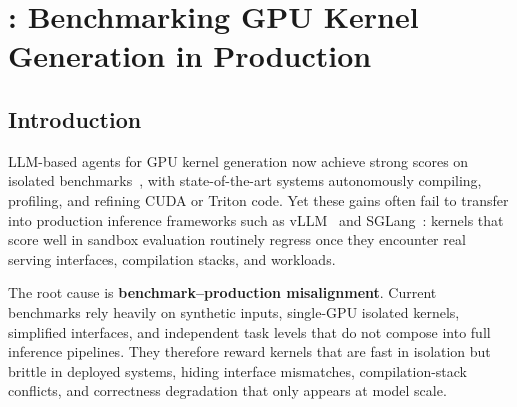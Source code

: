 \chapter{\FastKernels: Benchmarking GPU Kernel Generation in Production}
\label{ch:fastkernels}


\section{Introduction}
\label{fastkernels:sec:introduction}

LLM-based agents for GPU kernel generation now achieve strong scores on isolated benchmarks~\citep{kernelbench,solexecbench,flashinferbench}, with state-of-the-art systems autonomously compiling, profiling, and refining CUDA or Triton code.
Yet these gains often fail to transfer into production inference frameworks such as vLLM~\citep{vllm} and SGLang~\citep{sglang}: kernels that score well in sandbox evaluation routinely regress once they encounter real serving interfaces, compilation stacks, and workloads.

The root cause is \textbf{benchmark--production misalignment}.
Current benchmarks rely heavily on synthetic inputs, single-GPU isolated kernels, simplified interfaces, and independent task levels that do not compose into full inference pipelines.
They therefore reward kernels that are fast in isolation but brittle in deployed systems, hiding interface mismatches, compilation-stack conflicts, and correctness degradation that only appears at model scale.

